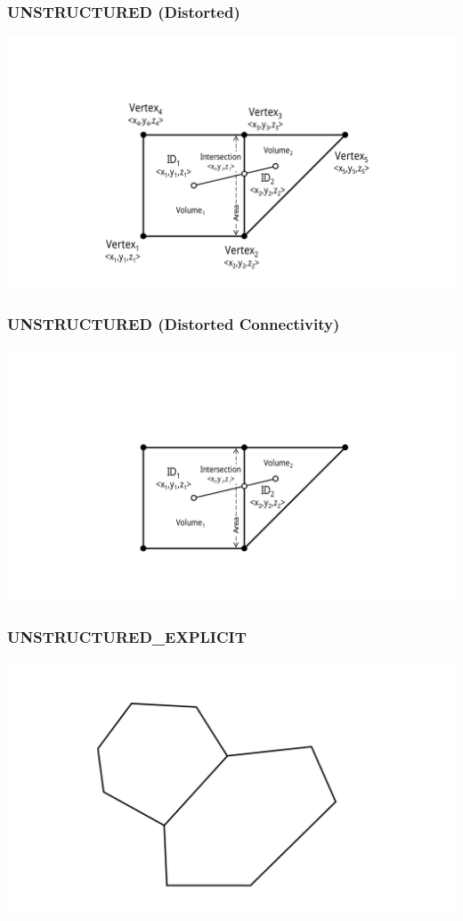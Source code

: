 \documentclass{beamer}
\begin{document}
\begin{frame}[fragile]\frametitle{UNSTRUCTURED (Distorted)}
\vspace{0.2in}
\centering
\includegraphics[width=1\linewidth]{./fe_distort_all}
\end{frame}

\begin{frame}[fragile]\frametitle{UNSTRUCTURED (Distorted Connectivity)}
\vspace{0.2in}
\centering
\includegraphics[width=1\linewidth]{./fe_distort_dual}
\end{frame}

\begin{frame}[fragile]\frametitle{UNSTRUCTURED\_EXPLICIT}
\vspace{0.2in}
\centering
\includegraphics[width=0.9\linewidth]{./voronoi_geom}
\end{frame}
\end{document}
